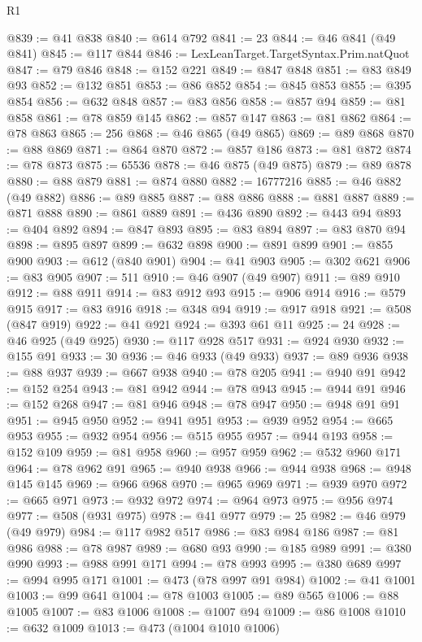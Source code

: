 \begin{lexlean}{R1}
\begin{coremodule}
@839 := @41 @838
@840 := @614 @792
@841 := 23
@844 := @46 @841 (@49 @841)
@845 := @117 @844
@846 := LexLeanTarget.TargetSyntax.Prim.natQuot
@847 := @79 @846
@848 := @152 @221
@849 := @847 @848
@851 := @83 @849 @93
@852 := @132 @851
@853 := @86 @852
@854 := @845 @853
@855 := @395 @854
@856 := @632 @848
@857 := @83 @856
@858 := @857 @94
@859 := @81 @858
@861 := @78 @859 @145
@862 := @857 @147
@863 := @81 @862
@864 := @78 @863
@865 := 256
@868 := @46 @865 (@49 @865)
@869 := @89 @868
@870 := @88 @869
@871 := @864 @870
@872 := @857 @186
@873 := @81 @872
@874 := @78 @873
@875 := 65536
@878 := @46 @875 (@49 @875)
@879 := @89 @878
@880 := @88 @879
@881 := @874 @880
@882 := 16777216
@885 := @46 @882 (@49 @882)
@886 := @89 @885
@887 := @88 @886
@888 := @881 @887
@889 := @871 @888
@890 := @861 @889
@891 := @436 @890
@892 := @443 @94
@893 := @404 @892
@894 := @847 @893
@895 := @83 @894
@897 := @83 @870 @94
@898 := @895 @897
@899 := @632 @898
@900 := @891 @899
@901 := @855 @900
@903 := @612 (@840 @901)
@904 := @41 @903
@905 := @302 @621
@906 := @83 @905
@907 := 511
@910 := @46 @907 (@49 @907)
@911 := @89 @910
@912 := @88 @911
@914 := @83 @912 @93
@915 := @906 @914
@916 := @579 @915
@917 := @83 @916
@918 := @348 @94
@919 := @917 @918
@921 := @508 (@847 @919)
@922 := @41 @921
@924 := @393 @61 @11
@925 := 24
@928 := @46 @925 (@49 @925)
@930 := @117 @928 @517
@931 := @924 @930
@932 := @155 @91
@933 := 30
@936 := @46 @933 (@49 @933)
@937 := @89 @936
@938 := @88 @937
@939 := @667 @938
@940 := @78 @205
@941 := @940 @91
@942 := @152 @254
@943 := @81 @942
@944 := @78 @943
@945 := @944 @91
@946 := @152 @268
@947 := @81 @946
@948 := @78 @947
@950 := @948 @91 @91
@951 := @945 @950
@952 := @941 @951
@953 := @939 @952
@954 := @665 @953
@955 := @932 @954
@956 := @515 @955
@957 := @944 @193
@958 := @152 @109
@959 := @81 @958
@960 := @957 @959
@962 := @532 @960 @171
@964 := @78 @962 @91
@965 := @940 @938
@966 := @944 @938
@968 := @948 @145 @145
@969 := @966 @968
@970 := @965 @969
@971 := @939 @970
@972 := @665 @971
@973 := @932 @972
@974 := @964 @973
@975 := @956 @974
@977 := @508 (@931 @975)
@978 := @41 @977
@979 := 25
@982 := @46 @979 (@49 @979)
@984 := @117 @982 @517
@986 := @83 @984 @186
@987 := @81 @986
@988 := @78 @987
@989 := @680 @93
@990 := @185 @989
@991 := @380 @990
@993 := @988 @991 @171
@994 := @78 @993
@995 := @380 @689
@997 := @994 @995 @171
@1001 := @473 (@78 @997 @91 @984)
@1002 := @41 @1001
@1003 := @99 @641
@1004 := @78 @1003
@1005 := @89 @565
@1006 := @88 @1005
@1007 := @83 @1006
@1008 := @1007 @94
@1009 := @86 @1008
@1010 := @632 @1009
@1013 := @473 (@1004 @1010 @1006)

\end{coremodule}
\end{lexlean}
